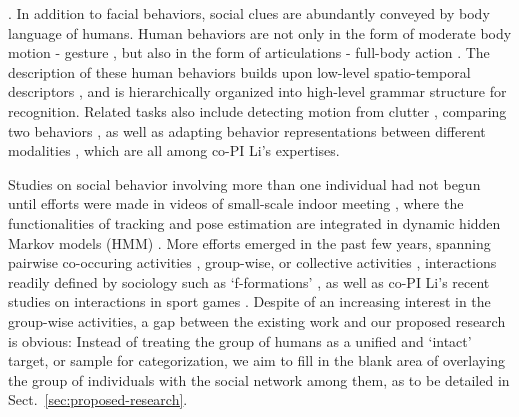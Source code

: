 . In addition to facial behaviors, social clues are abundantly conveyed by body language of humans. Human behaviors are not only in the form of moderate body motion - gesture \cite{Mitra:gesture}, but also in the form of articulations - full-body action \cite{Ryoo:action,Poppe}. The description of these human behaviors builds upon low-level spatio-temporal descriptors \cite{Dalal:HOG,Dollar:STIP,Laptev:STIP,Brox:flow}, and is hierarchically organized into high-level grammar structure \cite{Niebles2007,Niebles2006} for recognition.  Related tasks also include detecting motion from clutter \cite{Li2010}, comparing two behaviors \cite{LiPAMI 2012}, as well as adapting behavior representations between different modalities \cite{LiZickler2012,Li2011}, which are all among co-PI Li's expertises.

Studies on social behavior involving more than one individual had not begun until efforts were made in videos of small-scale indoor meeting \cite{GaticaPerez,McCowan:meeting}, where the functionalities of tracking \cite{Smith:track} and pose estimation \cite{Ba:meeting} are integrated in dynamic hidden Markov models (HMM) \cite{Zhang:meeting}. More efforts emerged in the past few years, spanning pairwise co-occuring activities \cite{UTdata}, group-wise, or collective activities \cite{Choi:context,Choi:recogtrack,Amer:group,Lan:Group}, interactions readily defined by sociology such as `f-formations' \cite{Cristani:fformation}, as well as co-PI Li's recent studies on interactions in sport games \cite{LiIJCV2012}.  Despite of an increasing interest in the group-wise activities, a gap between the existing work and our proposed research is obvious: Instead of treating the group of humans as a unified and `intact' target, or sample for categorization, we aim to fill in the blank area of overlaying the group of individuals with the social network among them, as to be detailed in Sect.~\ref{sec:proposed-research}.


